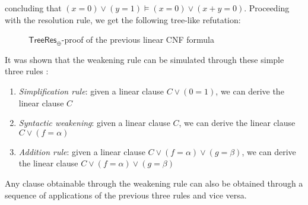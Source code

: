 concluding that $(x = 0) \lor (y = 1) \models (x = 0) \lor (x+y = 0)$. Proceeding with the resolution rule, we get the following tree-like refutation:
\begin{figure}[H]
    \centering
    

    \caption{$\mathsf{TreeRes}_\oplus$-proof of the previous linear CNF formula}
    \label{treelike_proof}
\end{figure}

It was shown that the weakening rule can be simulated through these simple three rules \cite{res_lin_2}:
\begin{enumerate}
    \item \textit{Simplification rule}: given a linear clause $C \lor (0 = 1)$, we can derive the linear clause $C$
    \item \textit{Syntactic weakening}: given a linear clause $C$, we can derive the linear clause $C \lor (f = \alpha)$
    \item \textit{Addition rule}: given a linear clause $C \lor (f = \alpha) \lor (g = \beta)$, we can derive the linear clause $C \lor (f = \alpha) \lor (g = \beta)$
\end{enumerate}

\begin{proposition}
    Any clause obtainable through the weakening rule can also be obtained through a sequence of applications of the previous three rules and vice versa.
\end{proposition}

